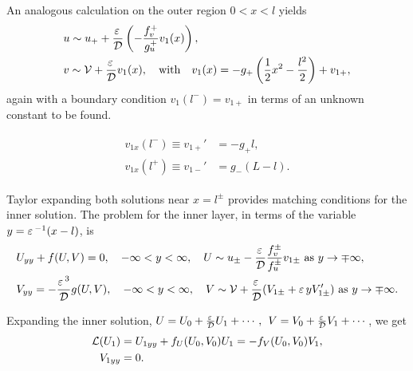 An analogous calculation on the outer region $0<x<l$ yields 
% 
\begin{equation*}
\begin{split}
\begin{aligned}
	&u\sim u_+ + \frac{\varepsilon\,}{\mathcal{D}}\left(-\frac{f_v^+}{g_u^+}v_1(x) \right),\\
	&v\sim \mathcal{V} + \frac{\varepsilon\,}{\mathcal{D}}v_1(x),\quad\text{with}\quad v_1(x) = -g_+\left(\frac{1}{2}x^2-\frac{l^2}{2} \right) + v_{1+},
\end{aligned}
\end{split}
\end{equation*}
%
again with a boundary condition $v_1(l^-)=v_{1+}$ in terms of an unknown constant to be found. 

% 
\begin{equation}
\label{eqn:matching_inner}
\begin{split}
\begin{aligned}
	v_{1x}(l^-)\equiv v_{1+}' &= -g_+l,\\
	v_{1x}(l^+)\equiv v_{1-}' &= g_-(L-l).
\end{aligned}
\end{split}
\end{equation}
%

Taylor expanding both solutions near $x=l^{\pm}$ provides matching conditions for the inner solution. The problem for the inner layer, in terms of the variable $y=\varepsilon\,^{-1}(x-l)$, is
% 
\begin{equation*}
\begin{split}
\begin{aligned}
	&U_{yy}+f(U,V)=0,\quad -\infty<y<\infty,\quad U\sim u_{\pm}-\frac{\varepsilon\,}{\mathcal{D}}\frac{f_v^{\pm}}{f_u^{\pm}}v_{1\pm}\text{ as }y\rightarrow\mp\infty ,\\
	&V_{yy}=-\frac{\varepsilon\,^3}{\mathcal{D}}g(U,V),\quad -\infty<y<\infty,\quad V\sim \mathcal{V}+\frac{\varepsilon\,}{\mathcal{D}}(V_{1\pm}+\varepsilon\, yV_{1\pm}') \text{ as }y\rightarrow\mp\infty.
\end{aligned}
\end{split}
\end{equation*}
%

Expanding the inner solution, $U = U_0 + \frac{\varepsilon\,}{\mathcal{D}}U_1 + \cdots,\hspace{1ex} V = V_0 + \frac{\varepsilon\,}{\mathcal{D}}V_1 + \cdots$, we get
% 
\begin{equation*}
\begin{split}
\begin{aligned}
	\mathcal{L}(U_1) &= U_{1yy}+f_U(U_0,V_0)U_1=-f_V(U_0,V_0)V_1,\\
	V_{1yy} &= 0.
\end{aligned}
\end{split}
\end{equation*}
%

